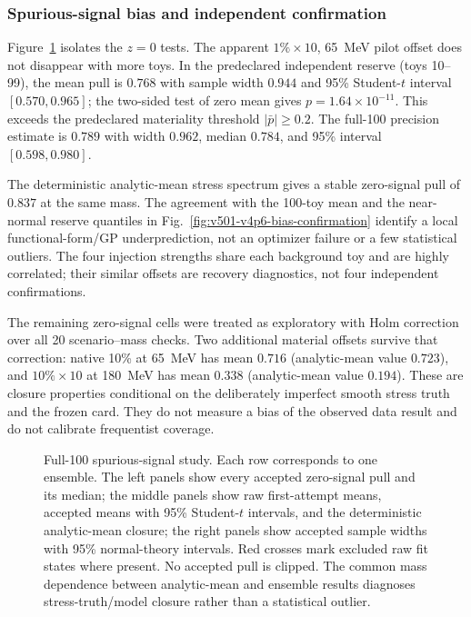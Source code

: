 \subsubsection{Spurious-signal bias and independent confirmation}

Figure~\ref{fig:v501-v4p6-zero-signal-spurious} isolates the $z=0$ tests.  The apparent
$1\%\times10$, 65~MeV pilot offset does not disappear with more toys.  In the
predeclared independent reserve (toys 10--99), the mean pull is
$0.768$ with sample width $0.944$ and 95\% Student-$t$ interval
$[0.570,0.965]$; the two-sided test of zero mean gives
$p=1.64\times10^{-11}$.  This exceeds the predeclared materiality threshold
$|\bar p|\geq0.2$.  The full-100 precision estimate is
$0.789$ with width $0.962$, median $0.784$, and 95\% interval
$[0.598,0.980]$.

The deterministic analytic-mean stress spectrum gives a stable zero-signal pull of
$0.837$ at the same mass.  The agreement with the 100-toy mean and the near-normal
reserve quantiles in Fig.~\ref{fig:v501-v4p6-bias-confirmation} identify a local
functional-form/GP underprediction, not an optimizer failure or a few statistical
outliers.  The four injection strengths share each background toy and are highly
correlated; their similar offsets are recovery diagnostics, not four independent
confirmations.

The remaining zero-signal cells were treated as exploratory with Holm correction over
all 20 scenario--mass checks.  Two additional material offsets survive that correction:
native 10\% at 65~MeV has mean $0.716$ (analytic-mean value $0.723$), and
$10\%\times10$ at 180~MeV has mean $0.338$ (analytic-mean value $0.194$).
These are closure properties conditional on the deliberately imperfect smooth stress
truth and the frozen card.  They do not measure a bias of the observed data result and
do not calibrate frequentist coverage.

\begin{figure}[p]
\centering
{}
\caption{Full-100 spurious-signal study.  Each row corresponds to one ensemble.  The
left panels show every accepted zero-signal pull and its median; the middle panels show
raw first-attempt means, accepted means with 95\% Student-$t$ intervals, and the
deterministic analytic-mean closure; the right panels show accepted sample widths with
95\% normal-theory intervals.  Red crosses mark excluded raw fit states where present.
No accepted pull is clipped.  The common mass dependence between analytic-mean and
ensemble results diagnoses stress-truth/model closure rather than a statistical
outlier.}
\label{fig:v501-v4p6-zero-signal-spurious}
\end{figure}

